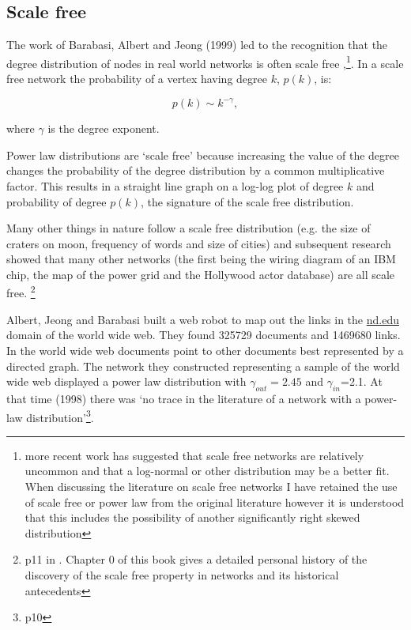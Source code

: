 \subsection{Scale free}
\label{sec:scale_free}
The work of Barabasi, Albert and Jeong (1999) led to the recognition that the degree distribution of nodes in real world networks is often scale free \cite{barabasi1999emergence},\cite{barabasi1999mean}\footnote{more recent work has suggested that scale free networks are relatively uncommon and that a log-normal or other distribution may be a better fit. When discussing the literature on scale free networks I have retained the use of scale free or power law from the original literature however it is understood that this includes the possibility of another significantly right skewed distribution}. In a scale free network the probability of a vertex having degree $k$, $p(k)$, is:

\begin{equation}
    p(k) \sim k^{-\gamma},
\end{equation}
\label{eq:scale free}

where $\gamma$ is the degree exponent\cite{barabasi2016network}.

Power law distributions are `scale free' because increasing the value of the degree changes the probability of the degree distribution by a common multiplicative factor. This results in a straight line graph on a log-log plot of degree $k$ and probability of degree $p(k)$, the signature of the scale free distribution\cite{beltrami2013mathematical}. 

Many other things in nature follow a scale free distribution (e.g. the size of craters on moon, frequency of words and size of cities) and subsequent research showed that many other networks (the first being the wiring diagram of an IBM chip, the map of the power grid and the Hollywood actor database) are all scale free\cite{barabasi2016network}. \footnote{ p11 in \cite{barabasi2016network}. Chapter 0 of this book gives a detailed personal history of the discovery of the scale free property in networks and its historical antecedents}

Albert, Jeong and Barabasi \cite{albert1999diameter} built a web robot to map out the links in the \url{nd.edu} domain of the world wide web. They found 325729 documents and 1469680 links. In  the world wide web documents point to other documents best represented by a directed graph. The network they constructed representing a sample of the world wide web displayed a power law distribution with $\gamma_{out}=2.45$ and $\gamma_{in}$=2.1. At that time (1998) there was `no trace in the literature of a network with a power-law distribution'\cite{barabasi2016network}\footnote{p10}.

